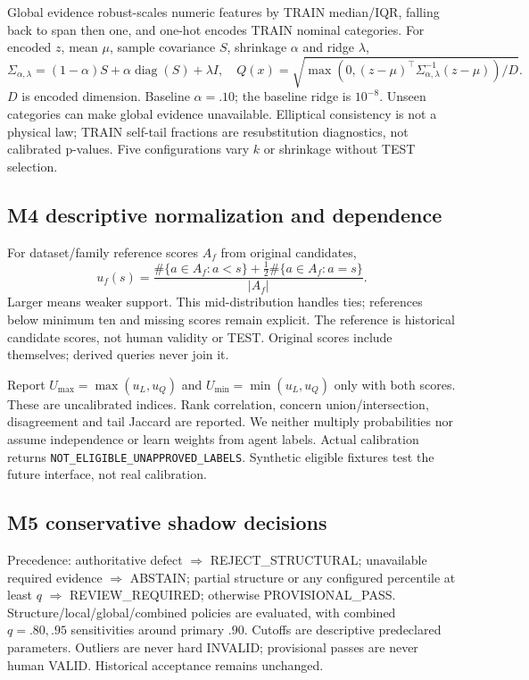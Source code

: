 Global evidence robust-scales numeric features by TRAIN median/IQR, falling back to span then one, and one-hot encodes TRAIN nominal categories. For encoded $z$, mean $\mu$, sample covariance $S$, shrinkage $\alpha$ and ridge $\lambda$,
\begin{equation}
\Sigma_{\alpha,\lambda}=(1-\alpha)S+\alpha\operatorname{diag}(S)+\lambda I,\quad
Q(x)=\sqrt{\max(0,(z-\mu)^\top\Sigma_{\alpha,\lambda}^{-1}(z-\mu))/D}.
\end{equation}
$D$ is encoded dimension. Baseline $\alpha=.10$; the baseline ridge is $10^{-8}$. Unseen categories can make global evidence unavailable. Elliptical consistency is not a physical law; TRAIN self-tail fractions are resubstitution diagnostics, not calibrated p-values. Five configurations vary $k$ or shrinkage without TEST selection.

\subsection{M4 descriptive normalization and dependence}
For dataset/family reference scores $A_f$ from original candidates,
\begin{equation}
u_f(s)=\frac{\#\{a\in A_f:a<s\}+\tfrac12\#\{a\in A_f:a=s\}}{|A_f|}.
\end{equation}
Larger means weaker support. This mid-distribution handles ties; references below minimum ten and missing scores remain explicit. The reference is historical candidate scores, not human validity or TEST. Original scores include themselves; derived queries never join it.

Report $U_{\max}=\max(u_L,u_Q)$ and $U_{\min}=\min(u_L,u_Q)$ only with both scores. These are uncalibrated indices. Rank correlation, concern union/intersection, disagreement and tail Jaccard are reported. We neither multiply probabilities nor assume independence or learn weights from agent labels. Actual calibration returns \texttt{NOT\_ELIGIBLE\_UNAPPROVED\_LABELS}. Synthetic eligible fixtures test the future interface, not real calibration.

\subsection{M5 conservative shadow decisions}
Precedence: authoritative defect $\Rightarrow$ REJECT\_STRUCTURAL; unavailable required evidence $\Rightarrow$ ABSTAIN; partial structure or any configured percentile at least $q$ $\Rightarrow$ REVIEW\_REQUIRED; otherwise PROVISIONAL\_PASS. Structure/local/global/combined policies are evaluated, with combined $q=.80,.95$ sensitivities around primary $.90$. Cutoffs are descriptive predeclared parameters. Outliers are never hard INVALID; provisional passes are never human VALID. Historical acceptance remains unchanged.

